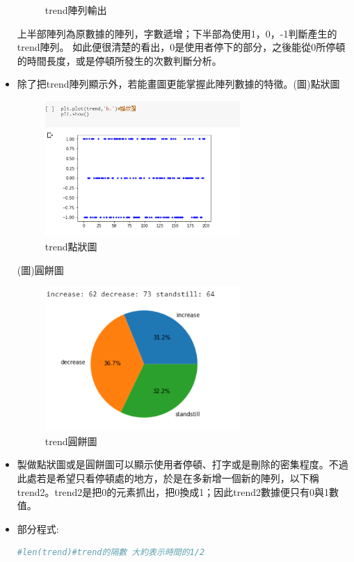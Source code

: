 \begin{itemize}
\begin{figure}[H]
		\caption{trend陣列輸出} 
		\label{Fig.3.11} 
	\end{figure}
	上半部陣列為原數據的陣列，字數遞增；下半部為使用1，0，-1判斷產生的trend陣列。
	如此便很清楚的看出，0是使用者停下的部分，之後能從0所停頓的時間長度，或是停頓所發生的次數判斷分析。
	\item 除了把trend陣列顯示外，若能畫圖更能掌握此陣列數據的特徵。(圖)點狀圖
	\begin{figure}[H] 
		\centering 
		\includegraphics[width=0.7\textwidth]{3_12.png} 
		\caption{trend點狀圖} 
		\label{Fig.3.12} 
	\end{figure}
	(圖)圓餅圖
	\begin{figure}[H] 
		\centering 
		\includegraphics[width=0.7\textwidth]{3_13.png} 
		\caption{trend圓餅圖} 
		\label{Fig.3.13} 
	\end{figure}
\item 製做點狀圖或是圓餅圖可以顯示使用者停頓、打字或是刪除的密集程度。不過此處若是希望只看停頓處的地方，於是在多新增一個新的陣列，以下稱trend2。trend2是把0的元素抓出，把0換成1；因此trend2數據便只有0與1數值。
\item 部分程式:
\begin{lstlisting}[language=Python,caption=python數據trend2]
#len(trend)#trend的隔數 大約表示時間的1/2

\end{lstlisting}
\end{itemize}
